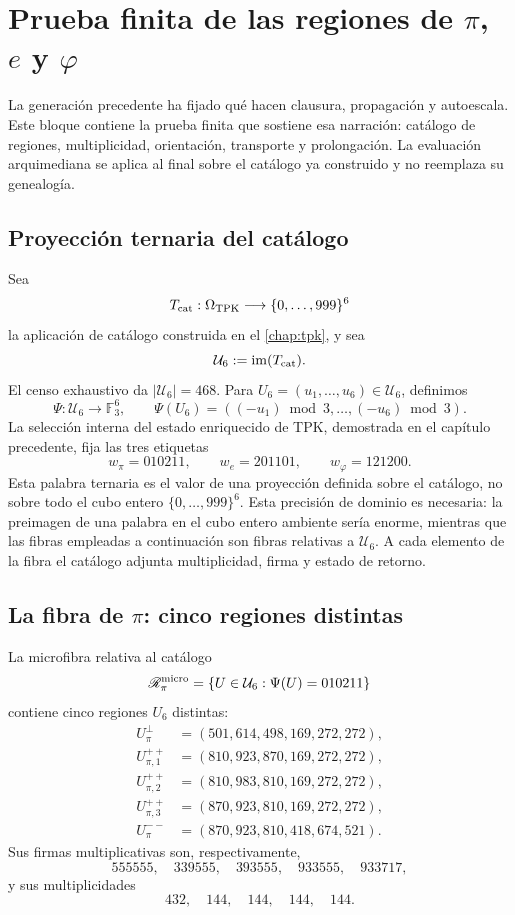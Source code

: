 \chapter{Prueba finita de las regiones de
\texorpdfstring{\(\pi\), \(e\) y \(\varphi\)}{pi, e y phi}}
\label{chap:regiones}

La generación precedente ha fijado qué hacen clausura, propagación
y autoescala. Este bloque contiene la prueba finita que sostiene esa
narración: catálogo de regiones, multiplicidad, orientación, transporte y
prolongación. La evaluación arquimediana se aplica al final sobre el
catálogo ya construido y no reemplaza su genealogía.

\section{Proyección ternaria del catálogo}

Sea
\[
 T_{\rm cat}:\Omega_{\rm TPK}\longrightarrow\{0,\ldots,999\}^6
\]
la aplicación de catálogo construida en el \cref{chap:tpk}, y sea
\[
 \mathcal U_6:=\operatorname{im}(T_{\rm cat}).
\]
El censo exhaustivo da \(|\mathcal U_6|=468\). Para
\(U_6=(u_1,\ldots,u_6)\in\mathcal U_6\), definimos
\[
\Psi:\mathcal U_6\longrightarrow\mathbb F_3^6,
\qquad
\Psi(U_6)=((-u_1)\bmod3,\ldots,(-u_6)\bmod3).
\]
La selección interna del estado enriquecido de TPK, demostrada en el capítulo
precedente, fija las tres etiquetas
\[
w_\pi=010211,
\qquad
w_e=201101,
\qquad
w_\varphi=121200.
\]
Esta palabra ternaria es el valor de una proyección definida sobre el
catálogo, no sobre todo el cubo entero \(\{0,\ldots,999\}^6\). Esta
precisión de dominio es necesaria: la preimagen de una palabra en el cubo
entero ambiente sería enorme,
mientras que las fibras empleadas a continuación son fibras relativas a
\(\mathcal U_6\). A cada elemento de la fibra el catálogo adjunta
multiplicidad, firma y estado de retorno.

\section{La fibra de \texorpdfstring{\(\pi\)}{pi}: cinco regiones distintas}

La microfibra relativa al catálogo
\[
\mathscr R_\pi^{\rm micro}
=\{U\in\mathcal U_6:\Psi(U)=010211\}
\]
contiene cinco regiones \(U_6\) distintas:
\[
\begin{aligned}
U_\pi^\perp&=(501,614,498,169,272,272),\\
U_{\pi,1}^{++}&=(810,923,870,169,272,272),\\
U_{\pi,2}^{++}&=(810,983,810,169,272,272),\\
U_{\pi,3}^{++}&=(870,923,810,169,272,272),\\
U_\pi^{--}&=(870,923,810,418,674,521).
\end{aligned}
\]
Sus firmas multiplicativas son, respectivamente,
\[
555555,\quad339555,\quad393555,\quad933555,\quad933717,
\]
y sus multiplicidades
\[
432,\quad144,\quad144,\quad144,\quad144.
\]

